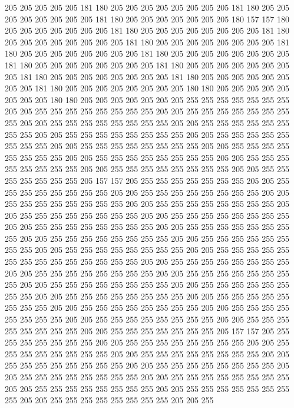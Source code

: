 205 205 205 205 205 181 180 205 205 205 205 205 205 205 205 181 180 205 205 205
205 205 205 205 205 181 180 205 205 205 205 205 205 205 180 157 157 180 205 205
205 205 205 205 205 181 180 205 205 205 205 205 205 205 205 181 180 205 205 205
205 205 205 205 205 181 180 205 205 205 205 205 205 205 205 181 180 205 205 205
205 205 205 205 205 181 180 205 205 205 205 205 205 205 205 181 180 205 205 205
205 205 205 205 205 181 180 205 205 205 205 205 205 205 205 181 180 205 205 205
205 205 205 205 205 181 180 205 205 205 205 205 205 205 205 181 180 205 205 205
205 205 205 205 205 180 180 205 205 205 205 205 205 205 205 180 180 205 205 205
205 205 205 205 255 255 255 255 255 255 255 205 205 255 255 255 255 255 255 255
255 205 205 255 255 255 255 255 255 255 255 205 205 255 255 255 255 255 255 255
255 205 205 255 255 255 255 255 255 255 255 205 205 255 255 255 255 255 255 255
255 205 205 255 255 255 255 255 255 255 255 205 205 255 255 255 255 255 255 255
255 205 205 255 255 255 255 255 255 255 255 205 205 255 255 255 255 255 255 255
255 205 205 255 255 255 255 255 255 255 255 205 205 255 255 255 255 255 255 255
255 205 205 255 255 255 255 255 255 255 205 157 157 205 255 255 255 255 255 255
255 205 205 255 255 255 255 255 255 255 255 205 205 255 255 255 255 255 255 255
255 205 205 255 255 255 255 255 255 255 255 205 205 255 255 255 255 255 255 255
255 205 205 255 255 255 255 255 255 255 255 205 205 255 255 255 255 255 255 255
255 205 205 255 255 255 255 255 255 255 255 205 205 255 255 255 255 255 255 255
255 205 205 255 255 255 255 255 255 255 255 205 205 255 255 255 255 255 255 255
255 205 205 255 255 255 255 255 255 255 255 205 205 255 255 255 255 255 255 255
255 255 255 255 255 255 255 205 205 255 255 255 255 255 255 255 255 205 205 255
255 255 255 255 255 255 255 205 205 255 255 255 255 255 255 255 255 205 205 255
255 255 255 255 255 255 255 205 205 255 255 255 255 255 255 255 255 205 205 255
255 255 255 255 255 255 255 205 205 255 255 255 255 255 255 255 255 205 205 255
255 255 255 255 255 255 255 205 205 255 255 255 255 255 255 255 255 205 205 255
255 255 255 255 255 255 255 205 205 255 255 255 255 255 255 255 255 205 205 255
255 255 255 255 255 255 205 157 157 205 255 255 255 255 255 255 255 205 205 255
255 255 255 255 255 255 255 205 205 255 255 255 255 255 255 255 255 205 205 255
255 255 255 255 255 255 255 205 205 255 255 255 255 255 255 255 255 205 205 255
255 255 255 255 255 255 255 205 205 255 255 255 255 255 255 255 255 205 205 255
255 255 255 255 255 255 255 205 205 255 255 255 255 255 255 255 255 205 205 255
255 255 255 255 255 255 255 205 205 255 255 255 255 255 255 255 255 205 205 255
